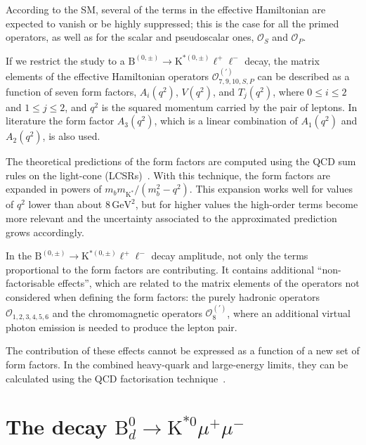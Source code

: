 According to the SM, several of the terms in the effective Hamiltonian are expected to vanish or be highly suppressed; this is the case for all the primed operators, as well as for the scalar and pseudoscalar ones, ${\mathcal{O}}_{S}$ and ${\mathcal{O}}_{P}$.

If we restrict the study to a $\mathrm{B}^{(0,\pm)}\to\mathrm{K}^{*(0,\pm)}\ell^+\ell^-$ decay, the matrix elements of the effective Hamiltonian operators ${\mathcal{O}}^{(\prime)}_{7,9,10,S,P}$ can be described as a function of seven form factors, $A_i(q^2)$, $V(q^2)$, and $T_j(q^2)$, where $0\le i\le2$ and $1\le j\le2$, and $q^2$ is the squared momentum carried by the pair of leptons.
In literature the form factor $A_3(q^2)$, which is a linear combination of $A_1(q^2)$ and $A_2(q^2)$, is also used.

The theoretical predictions of the form factors are computed using the QCD sum rules on the light-cone (LCSRs)~\cite{Khodjamirian:2001bj}.
With this technique, the form factors are expanded in powers of $m_b m_{\mathrm{K}^*}/(m_b^2-q^2)$.
This expansion works well for values of $q^2$ lower than about $8\,\mathrm{GeV}^2$, but for higher values the high-order terms become more relevant and the uncertainty associated to the approximated prediction grows accordingly.

In the $\mathrm{B}^{(0,\pm)}\to\mathrm{K}^{*(0,\pm)}\ell^+\ell^-$ decay amplitude, not only the terms proportional to the form factors are contributing.
It contains additional ``non-factorisable effects'', which are related to the matrix elements of the operators not considered when defining the form factors: the purely hadronic operators ${\mathcal{O}}_{1,2,3,4,5,6}$ and the chromomagnetic operators ${\mathcal{O}}^{(\prime)}_{8}$, where an additional virtual photon emission is needed to produce the lepton pair.

The contribution of these effects cannot be expressed as a function of a new set of form factors.
In the combined heavy-quark and large-energy limits, they can be calculated using the QCD factorisation technique~\cite{Beneke:2000wa,Beneke:2001at,Beneke:2004dp}.


\section[The decay B0 to K*0 mu+ mu-]{The decay $\mathrm{B}^0_d \to \mathrm{K}^{*0} \mu^+ \mu^-$}
\label{sec:Kstmm}

